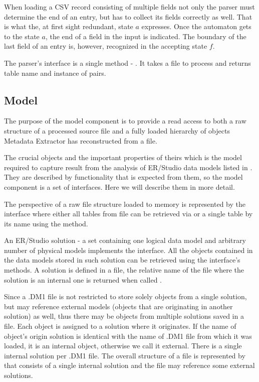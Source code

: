 When loading a CSV record consisting of multiple fields not only the parser must determine the end of an entry, but has to collect its fields correctly as well. That is what the, at first sight redundant, state $a$ expresses. Once the automaton gets to the state $a$, the end of a field in the input is indicated. 
The boundary of the last field of an entry is, however, recognized in the accepting state $f$.

The parser's interface is a single method - . It takes a file to process and returns table name and instance of  pairs.

\subsection{Model}

The purpose of the model component is to provide a read access to both a raw structure of a processed source file and a fully loaded hierarchy of objects Metadata Extractor has reconstructed from a file.

The crucial objects and the important properties of theirs which is the model required to capture result from the analysis of ER/Studio data models listed in . They are described by functionality that is expected from them, so the model component is a set of interfaces. Here we will describe them in more detail.

The perspective of a raw file structure loaded to memory is represented by the interface  where either all tables from file can be retrieved via  or a single table by its name using the  method.

An ER/Studio solution - a set containing one logical data model and arbitrary number of physical models implements the  interface. All the objects contained in the data models stored in such solution can be retrieved using the interface's methods. A solution is defined in a file, the relative name of the file where the solution is an internal one is returned when called .

Since a .DM1 file is not restricted to store solely objects from a single solution, but may reference external models (objects that are originating in another solution) as well, thus there may be objects from multiple solutions saved in a file. Each object is assigned to a solution where it originates.
If the name of object's origin solution is identical with the name of .DM1 file from which it was loaded, it is an internal object, otherwise we call it external. There is a single internal solution per .DM1 file. 
The overall structure of a file is represented by  that consists of a single internal solution and the file may reference some external solutions.

